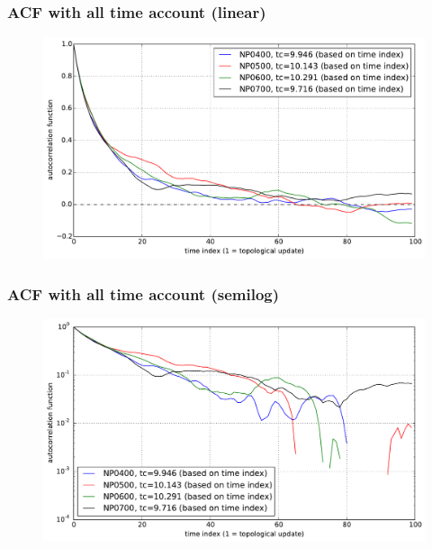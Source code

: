 \documentclass[slidestop, compress, mathserif]{beamer}
\begin{document}
\begin{frame}
  \frametitle<presentation>{ACF with all time account (linear)}
  \begin{figure}
    \centering
    \includegraphics[height=0.75\textheight]{../ACF_all_counting_linear.pdf}
  \end{figure}
\end{frame}

\begin{frame}
  \frametitle<presentation>{ACF with all time account (semilog)}
  \begin{figure}
    \centering
    \includegraphics[height=0.75\textheight]{../ACF_all_counting_semilogy.pdf}
  \end{figure}
\end{frame}
\end{document}
